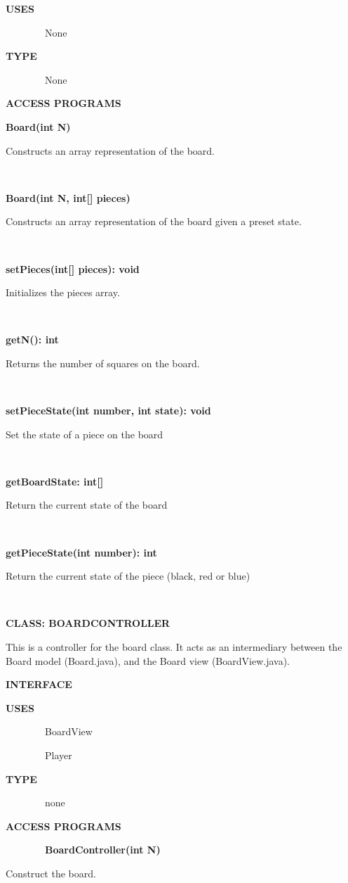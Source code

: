 \documentclass{article}
\begin{document}
{{\textbf{USES}}

{~~~~~~~~None}

{\textbf{TYPE}}

{~~~~~~~~None}

{\textbf{ACCESS PROGRAMS}}

{\textbf{Board(int N)}}

{Constructs an array representation of the board.}

{~}

{\textbf{Board(int N, int{[}{]} pieces)}}

{Constructs an array representation of the board given a preset state.}

{~}

{\textbf{setPieces(int{[}{]} pieces): void}}

{Initializes the pieces array.}

{~}

{\textbf{getN(): int}}

{Returns the number of squares on the board.}

{~}

{\textbf{setPieceState(int number, int state): void}}

{Set the state of a piece on the board}

{~}

{\textbf{getBoardState: int{[}{]}}}

{Return the current state of the board}

{~}

{\textbf{getPieceState(int number): int}}

{Return the current state of the piece (black, red or blue)}

{~}

{\textbf{CLASS: BOARDCONTROLLER}}

{This is a controller for the board class. It acts as an intermediary
between the Board model (Board.java), and the Board view
(BoardView.java).}

{\textbf{INTERFACE}}

{\textbf{USES}}

{~~~~~~~~BoardView}

{~~~~~~~~Player}

{\textbf{TYPE}}

{~~~~~~~~none}

{\textbf{ACCESS PROGRAMS}}

{~~~~~~~~\textbf{BoardController(int N) }}

{Construct the board.~~~~~~~~}

}
\end{document}
